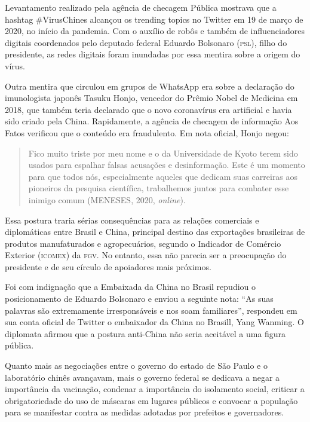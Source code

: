 Levantamento realizado pela agência de checagem Pública mostrava que a
hashtag \#VirusChines alcançou os trending topics no Twitter em 19 de
março de 2020, no início da pandemia. Com o auxílio de robôs e também de
influenciadores digitais coordenados pelo deputado federal Eduardo
Bolsonaro (\textsc{psl}), filho do presidente, as redes digitais foram
inundadas por essa mentira sobre a origem do vírus.

Outra mentira que circulou em grupos de WhatsApp era sobre a declaração
do imunologista japonês Tasuku Honjo, vencedor do Prêmio Nobel de
Medicina em 2018, que também teria declarado que o novo coronavírus era
artificial e havia sido criado pela China. Rapidamente, a agência de
checagem de informação Aos Fatos verificou que o conteúdo era
fraudulento. Em nota oficial, Honjo negou:

\begin{quote}
Fico muito triste por meu nome e o da Universidade de Kyoto terem sido
usados ​​para espalhar falsas acusações e desinformação. Este é um
momento para que todos nós, especialmente aqueles que dedicam suas
carreiras aos pioneiros da pesquisa científica, trabalhemos juntos para
combater esse inimigo comum (MENESES, 2020, \textit{online}).
\end{quote}

Essa postura traria sérias consequências para as relações comerciais e
diplomáticas entre Brasil e China, principal destino das exportações
brasileiras de produtos manufaturados e agropecuários, segundo o
Indicador de Comércio Exterior (\textsc{icomex}) da \textsc{fgv}. No entanto, essa não parecia ser a preocupação do presidente e de
seu círculo de apoiadores mais próximos.

Foi com indignação que a Embaixada da China no Brasil repudiou o
posicionamento de Eduardo Bolsonaro e enviou a seguinte nota: ``As suas
palavras são extremamente irresponsáveis e nos soam familiares'',
respondeu em sua conta oficial de Twitter o embaixador da China no
Brasill, Yang Wanming. O diplomata afirmou que a postura anti-China não
seria aceitável a uma figura pública.

Quanto mais as negociações entre o governo do estado de São Paulo e o
laboratório chinês avançavam, mais o governo federal se dedicava a negar
a importância da vacinação, condenar a importância do isolamento social,
criticar a obrigatoriedade do uso de máscaras em lugares públicos e
convocar a população para se manifestar contra as medidas adotadas por
prefeitos e governadores.

